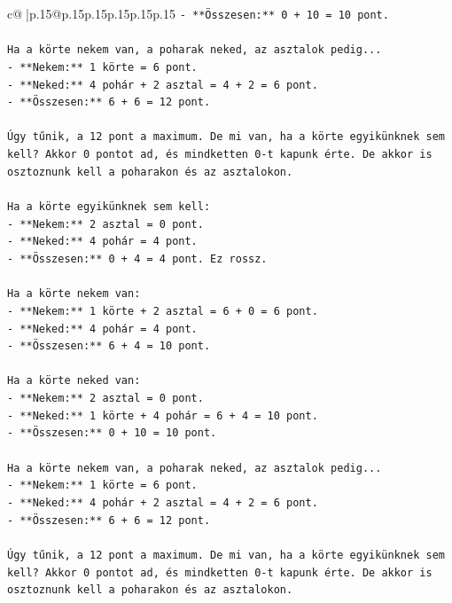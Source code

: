 \documentclass{article}
\begin{document}
{\begin{supertabular}{c@{$\;$}|p{.15\linewidth}@{}p{.15\linewidth}p{.15\linewidth}p{.15\linewidth}p{.15\linewidth}p{.15\linewidth}}
{{{\texttt{{-} **Összesen:** 0 + 10 = 10 pont.} \\
\\ 
\texttt{Ha a körte nekem van, a poharak neked, az asztalok pedig...} \\
\texttt{{-} **Nekem:** 1 körte = 6 pont.} \\
\texttt{{-} **Neked:** 4 pohár + 2 asztal = 4 + 2 = 6 pont.} \\
\texttt{{-} **Összesen:** 6 + 6 = 12 pont.} \\
\\ 
\texttt{Úgy tűnik, a 12 pont a maximum. De mi van, ha a körte egyikünknek sem kell? Akkor 0 pontot ad, és mindketten 0{-}t kapunk érte. De akkor is osztoznunk kell a poharakon és az asztalokon.} \\
\\ 
\texttt{Ha a körte egyikünknek sem kell:} \\
\texttt{{-} **Nekem:** 2 asztal = 0 pont.} \\
\texttt{{-} **Neked:** 4 pohár = 4 pont.} \\
\texttt{{-} **Összesen:** 0 + 4 = 4 pont. Ez rossz.} \\
\\ 
\texttt{Ha a körte nekem van:} \\
\texttt{{-} **Nekem:** 1 körte + 2 asztal = 6 + 0 = 6 pont.} \\
\texttt{{-} **Neked:** 4 pohár = 4 pont.} \\
\texttt{{-} **Összesen:** 6 + 4 = 10 pont.} \\
\\ 
\texttt{Ha a körte neked van:} \\
\texttt{{-} **Nekem:** 2 asztal = 0 pont.} \\
\texttt{{-} **Neked:** 1 körte + 4 pohár = 6 + 4 = 10 pont.} \\
\texttt{{-} **Összesen:** 0 + 10 = 10 pont.} \\
\\ 
\texttt{Ha a körte nekem van, a poharak neked, az asztalok pedig...} \\
\texttt{{-} **Nekem:** 1 körte = 6 pont.} \\
\texttt{{-} **Neked:** 4 pohár + 2 asztal = 4 + 2 = 6 pont.} \\
\texttt{{-} **Összesen:** 6 + 6 = 12 pont.} \\
\\ 
\texttt{Úgy tűnik, a 12 pont a maximum. De mi van, ha a körte egyikünknek sem kell? Akkor 0 pontot ad, és mindketten 0{-}t kapunk érte. De akkor is osztoznunk kell a poharakon és az asztalokon.} \\
}}}
\end{supertabular}}
\end{document}
